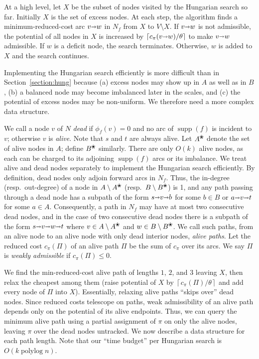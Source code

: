 \documentclass[a4paper,UKenglish,nolineno]{socg-lipics-v2019}
\def\polylog{\mathop{\mathrm{polylog}}}
\def\Ceil#1{\left\lceil #1 \right\rceil}
\def\fsupply{\phi}
\def\arcto{\mathord\shortrightarrow}
\def\arc#1#2{#1\arcto#2}
\def\supp{\operatorname{supp}}
\def\alive#1{{#1}^\text{\ding{96}}}
\def\dead#1{{#1} \setminus \alive{#1}}
\def\EMPH#1{\textcolor{BrickRed}{{\emph{#1}}}}
\begin{document}
At a high level, let \EMPH{$X$} be the subset of nodes visited by the Hungarian search
so far.
Initially $X$ is the set of excess nodes.
At each step, the algorithm finds a minimum-reduced-cost arc $\arc vw$ in $N_f$
from $X$ to $V \setminus X$.
If $\arc vw$ is not admissible, the potential of all nodes in $X$ is increased
by $\Ceil{c_\pi(\arc vw)/\theta}$ to make $\arc vw$ admissible.
If $w $ is a deficit node, the search terminates.
Otherwise, $w$ is added to $X$ and the search continues.

Implementing the Hungarian search efficiently is more difficult than in
Section~\ref{section:hung} because (a) excess nodes may show up in $A$ as well as in $B$,
(b) a balanced node may become imbalanced later in the scales,
and (c) the potential of excess nodes may be non-uniform.
We therefore need a more complex data structure.

We call a node $v$ of $N$ \EMPH{dead} if $\fsupply_f(v) = 0$ and no arc of
$\supp(f)$ is incident to $v$; otherwise $v$ is \EMPH{alive}.
Note that $s$ and $t$ are always alive.
Let \EMPH{$\alive{A}$} denote the set of alive nodes in $A$; define \EMPH{$\alive{B}$} similarly.
There are only $O(k)$ alive nodes, as each can be charged to its
adjoining $\supp(f)$ arcs or its imbalance.
We treat alive and dead nodes separately to implement the Hungarian search
efficiently.
By definition, dead nodes only adjoin forward arcs in $N_f$.
Thus, the in-degree (resp.\ out-degree) of a node in $\dead{A}$ (resp.\ $\dead{B}$)
is 1, and any path passing through a dead node has a subpath of the form
$s \arcto v \arcto b$ for some $b \in B$ or $a \arcto v \arcto t$ for some $a \in A$.
Consequently, a path in $N_f$ may have at most two consecutive dead nodes,
and in the case of two consecutive dead nodes there is a subpath of the
form $s \arcto v \arcto w \arcto t$ where $v \in \dead{A}$ and $w \in \dead{B}$.
We call such paths, from an alive node to an alive node
with only dead interior nodes, \EMPH{alive paths}.
Let the reduced cost $c_\pi(\Pi)$ of an alive path $\Pi$ be the sum of $c_\pi$ over its arcs.
We say $\Pi$ is \EMPH{weakly admissible} if $c_\pi(\Pi) \leq 0$.

We find the min-reduced-cost alive path of lengths $1$, $2$, and $3$
leaving $X$, then relax the cheapest among them
(raise potential of $X$ by $\Ceil{c_\pi(\Pi)/\theta}$ and add every node of $\Pi$ into $X$).
Essentially, relaxing alive paths ``skips over'' dead nodes.
Since reduced costs telescope on paths, weak admissibility of an alive path
depends only on the potential of its alive endpoints.
Thus, we can query the minimum alive path using a partial assignment
of $\pi$ on only the alive nodes, leaving $\pi$ over the dead nodes untracked.
%
We now describe a data structure for each path length.
Note that our ``time budget'' per Hungarian search is $O(k\polylog n)$.
\end{document}
